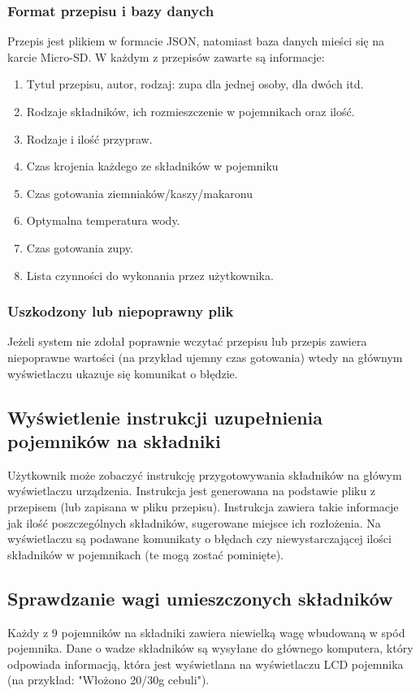 \documentclass[12pt,a4paper,notitlepage]{article}
\begin{document}
\subsubsection{Format przepisu i bazy danych}
Przepis jest plikiem w formacie JSON, natomiast baza danych mieści się na karcie Micro-SD. W każdym z przepisów zawarte są informacje:
\begin{enumerate}
  \item Tytuł przepisu, autor, rodzaj: zupa dla jednej osoby, dla dwóch itd.
  \item Rodzaje składników, ich rozmieszczenie w pojemnikach oraz ilość.
  \item Rodzaje i ilość przypraw.
  \item Czas krojenia każdego ze składników w pojemniku
  \item Czas gotowania ziemniaków/kaszy/makaronu
  \item Optymalna temperatura wody.
  \item Czas gotowania zupy.
  \item Lista czynności do wykonania przez użytkownika.
\end{enumerate}

\subsubsection{Uszkodzony lub niepoprawny plik}
Jeżeli system nie zdołał poprawnie wczytać przepisu lub przepis zawiera niepoprawne wartości (na przykład ujemny czas gotowania) wtedy na głównym wyświetlaczu ukazuje się komunikat o błędzie.

\subsection{Wyświetlenie instrukcji uzupełnienia pojemników na składniki}
Użytkownik może zobaczyć instrukcję przygotowywania składników na główym wyświetlaczu urządzenia. Instrukcja jest generowana na podstawie pliku z przepisem (lub zapisana w pliku przepisu). Instrukcja zawiera takie informacje jak ilość poszczególnych składników, sugerowane miejsce ich rozłożenia. Na wyświetlaczu są podawane komunikaty o błędach czy niewystarczającej ilości składników w pojemnikach (te mogą zostać pominięte).

\subsection{Sprawdzanie wagi umieszczonych składników}
Każdy z 9 pojemników na składniki zawiera niewielką wagę wbudowaną w spód pojemnika. Dane o wadze składników są wysyłane do głównego komputera, który odpowiada informacją, która jest wyświetlana na wyświetlaczu LCD pojemnika (na przykład: "Włożono 20/30g cebuli").
\end{document}
